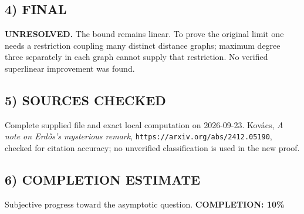\subsection*{4) FINAL}
\textbf{UNRESOLVED.} The bound remains linear. To prove the original limit one needs a restriction coupling many distinct distance graphs; maximum degree three separately in each graph cannot supply that restriction. No verified superlinear improvement was found.
\subsection*{5) SOURCES CHECKED}
Complete supplied file and exact local computation on 2026-09-23. Kov\'acs, \emph{A note on Erd\H{o}s's mysterious remark}, \texttt{https://arxiv.org/abs/2412.05190}, checked for citation accuracy; no unverified classification is used in the new proof.
\subsection*{6) COMPLETION ESTIMATE}
Subjective progress toward the asymptotic question.
\textbf{COMPLETION: 10\%}
